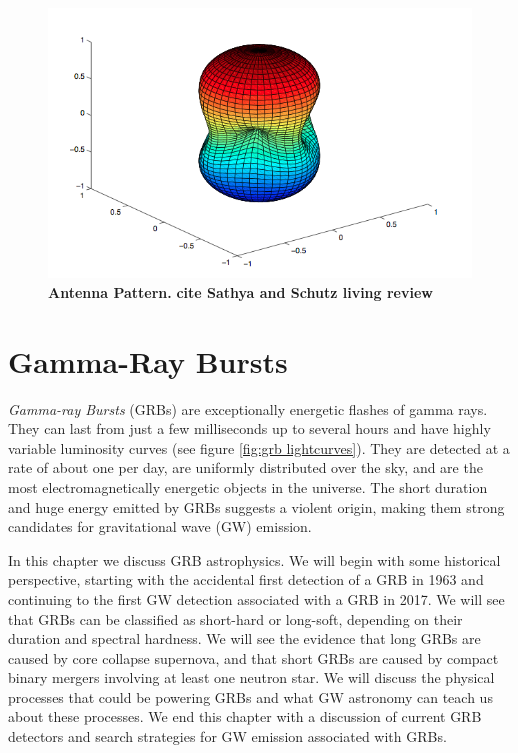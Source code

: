 \documentclass[11pt]{cuthesis}
\begin{document}
\begin{figure} %
\begin{center}
\includegraphics[width=0.8\linewidth]{antenna_pattern.png}
\end{center}
\caption{\textbf{Antenna Pattern.} \textbf{cite Sathya and Schutz living review} }
\label{fig:antenna pattern}
\end{figure}


\chapter{Gamma-Ray Bursts} \label{chap:GRBs}
\textit{Gamma-ray Bursts} (GRBs) are exceptionally energetic flashes of gamma rays. They can last from just a few milliseconds up to several hours and have highly variable luminosity curves (see figure \ref{fig:grb lightcurves}). They are detected at a rate of about one per day, are uniformly distributed over the sky, and are the most electromagnetically energetic objects in the universe. The short duration and huge energy emitted by GRBs suggests a violent origin, making them strong candidates for gravitational wave (GW) emission.

In this chapter we discuss GRB astrophysics. We will begin with some historical perspective, starting with the accidental first detection of a GRB in 1963 and continuing to the first GW detection associated with a GRB in 2017. We will see that GRBs can be classified as short-hard or long-soft, depending on their duration and spectral hardness. We will see the evidence that long GRBs are caused by core collapse supernova, and that short GRBs are caused by compact binary mergers involving at least one neutron star. We will discuss the physical processes that could be powering GRBs and what GW astronomy can teach us about these processes. We end this chapter with a discussion of current GRB detectors and search strategies for GW emission associated with GRBs.
\end{document}
